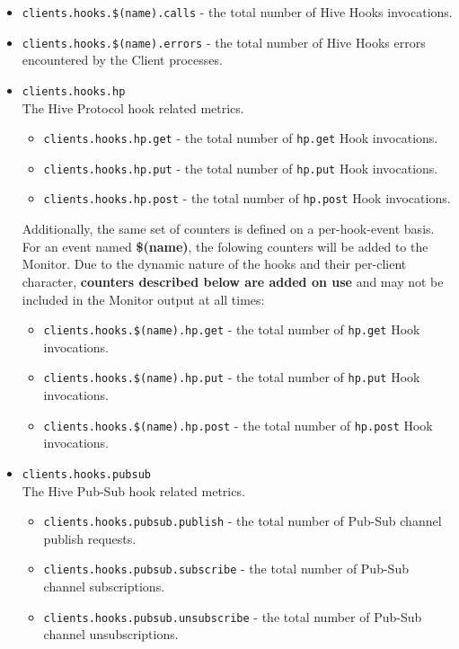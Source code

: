 \documentclass[a4paper]{article}
\begin{document}
\begin{itemize}
\item \texttt{clients.hooks.\$(name).calls} - the total number of Hive Hooks invocations.
\item \texttt{clients.hooks.\$(name).errors} - the total number of Hive Hooks errors encountered by the Client processes.
\end{itemize}
\begin{itemize}

\item \texttt{clients.hooks.hp}\\
\label{sec-4-2-10-1}%
The Hive Protocol hook related metrics.


\begin{itemize}
\item \texttt{clients.hooks.hp.get} - the total number of \texttt{hp.get} Hook invocations.
\item \texttt{clients.hooks.hp.put} - the total number of \texttt{hp.put} Hook invocations.
\item \texttt{clients.hooks.hp.post} - the total number of \texttt{hp.post} Hook invocations.
\end{itemize}

\noindent
Additionally, the same set of counters is defined on a per-hook-event basis. For an event named \textbf{\$(name)}, the folowing counters will be added to the Monitor. Due to the dynamic nature of the hooks and their per-client character, \textbf{counters described below are added on use} and may not be included in the Monitor output at all times:


\begin{itemize}
\item \texttt{clients.hooks.\$(name).hp.get} - the total number of \texttt{hp.get} Hook invocations.
\item \texttt{clients.hooks.\$(name).hp.put} - the total number of \texttt{hp.put} Hook invocations.
\item \texttt{clients.hooks.\$(name).hp.post} - the total number of \texttt{hp.post} Hook invocations.
\end{itemize}


\item \texttt{clients.hooks.pubsub}\\
\label{sec-4-2-10-2}%
The Hive Pub-Sub hook related metrics.


\begin{itemize}
\item \texttt{clients.hooks.pubsub.publish} - the total number of Pub-Sub channel publish requests.
\item \texttt{clients.hooks.pubsub.subscribe} - the total number of Pub-Sub channel subscriptions.
\item \texttt{clients.hooks.pubsub.unsubscribe} - the total number of Pub-Sub channel unsubscriptions.
\end{itemize}


\end{itemize}
\end{document}
